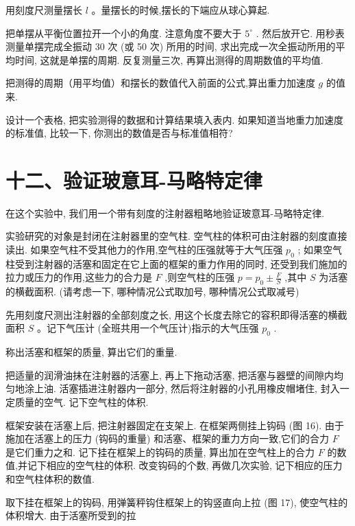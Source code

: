 \documentclass[10pt]{article}
\begin{document}
用刻度尺测量摆长 \(l\) 。量摆长的时候,摆长的下端应从球心算起.

把单摆从平衡位置拉开一个小的角度. 注意角度不要大于 \({5}^{ \circ }\) . 然后放开它. 用秒表测量单摆完成全振动 30 次 (或 50 次) 所用的时间, 求出完成一次全振动所用的平均时间, 这就是单摆的周期. 反复测量三次, 再算出测得的周期数值的平均值.

把测得的周期（用平均值）和摆长的数值代入前面的公式,算出重力加速度 \(g\) 的值来.

设计一个表格, 把实验测得的数据和计算结果填入表内. 如果知道当地重力加速度的标准值, 比较一下, 你测出的数值是否与标准值相符?

\section*{十二、验证玻意耳-马略特定律}

在这个实验中, 我们用一个带有刻度的注射器粗略地验证玻意耳-马略特定律.

实验研究的对象是封闭在注射器里的空气柱. 空气柱的体积可由注射器的刻度直接读出. 如果空气柱不受其他力的作用,空气柱的压强就等于大气压强 \({p}_{0}\) ; 如果空气柱受到注射器的活塞和固定在它上面的框架的重力作用的同时, 还受到我们施加的拉力或压力的作用,这些力的合力是 \(F\) ,则空气柱的压强 \(p = {p}_{0} \pm \frac{F}{S}\) ,其中 \(S\) 为活塞的横截面积. (请考虑一下, 哪种情况公式取加号, 哪种情况公式取减号)

先用刻度尺测出注射器的全部刻度之长, 用这个长度去除它的容积即得活塞的横截面积 \(S\) 。记下气压计 (全班共用一个气压计)指示的大气压强 \({p}_{0}\) .

称出活塞和框架的质量, 算出它们的重量.

把适量的润滑油抹在注射器的活塞上, 再上下拖动活塞, 把活塞与器壁的间隙内均匀地涂上油. 活塞插进注射器内一部分, 然后将注射器的小孔用橡皮帽堵住, 封入一定质量的空气. 记下空气柱的体积.

框架安装在活塞上后, 把注射器固定在支架上. 在框架两侧挂上钩码 (图 16). 由于施加在活塞上的压力 (钩码的重量) 和活塞、框架的重力方向一致,它们的合力 \(F\) 是它们重力之和. 记下挂在框架上的钩码的质量, 算出加在空气柱上的合力 \(F\) 的数值,并记下相应的空气柱的体积. 改变钩码的个数, 再做几次实验, 记下相应的压力和空气柱体积的数值.

取下挂在框架上的钩码, 用弹簧秤钩住框架上的钩竖直向上拉 (图 17), 使空气柱的体积增大. 由于活塞所受到的拉
\end{document}
